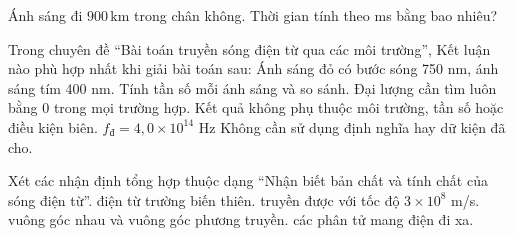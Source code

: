 \begin{ex}
Ánh sáng đi $900\,\text{km}$ trong chân không. Thời gian tính theo ms bằng bao nhiêu?
\end{ex}

\begin{ex}
Trong chuyên đề “Bài toán truyền sóng điện từ qua các môi trường”, Kết luận nào phù hợp nhất khi giải bài toán sau: Ánh sáng đỏ có bước sóng 750 nm, ánh sáng tím 400 nm. Tính tần số mỗi ánh sáng và so sánh.
\choice
{Đại lượng cần tìm luôn bằng 0 trong mọi trường hợp.}
{Kết quả không phụ thuộc môi trường, tần số hoặc điều kiện biên.}
{\True $f_đ=4,0\times10^{14}$ Hz}
{Không cần sử dụng định nghĩa hay dữ kiện đã cho.}
\end{ex}

\begin{ex}
Xét các nhận định tổng hợp thuộc dạng “Nhận biết bản chất và tính chất của sóng điện từ”.
\choiceTF
{\True điện từ trường biến thiên.}
{\True truyền được với tốc độ $3\times10^8$ m/s.}
{\True vuông góc nhau và vuông góc phương truyền.}
{các phân tử mang điện đi xa.}
\end{ex}

